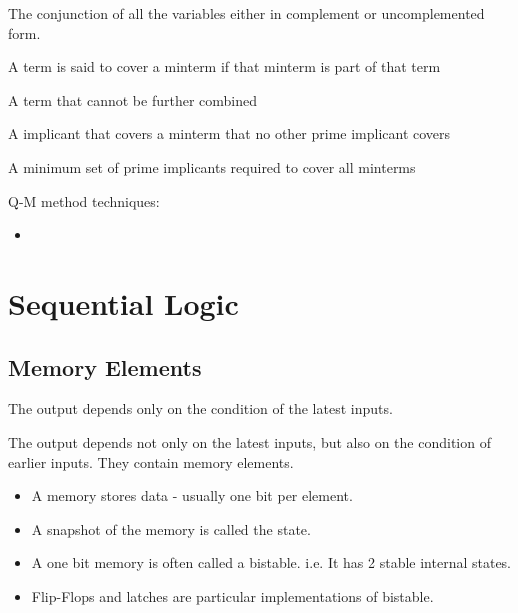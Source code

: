 \documentclass[a4paper]{article}
\begin{document}
\begin{defi}[Minterms]
The conjunction of all the variables either in complement or uncomplemented form.
\end{defi}

\begin{defi}[Cover]
A term is said to cover a minterm if that minterm is part of that term
\end{defi}
\begin{defi}
A term that cannot be further combined
\end{defi}
\begin{defi}
A implicant that covers a minterm that no other prime implicant covers
\end{defi}
\begin{defi}
A minimum set of prime implicants required to cover all minterms
\end{defi}

Q-M method techniques:
\begin{itemize}
\item 
\end{itemize}
\section{Sequential Logic}
\subsection{Memory Elements}
\begin{defi}
The output depends only on the condition of the latest inputs.
\end{defi}

\begin{defi}
The output depends not only on the latest inputs, but also on the condition of earlier inputs. They contain memory elements.
\begin{itemize}
\item A memory stores data - usually one bit per element.
\item A snapshot of the memory is called the state.
\item A one bit memory is often called a bistable. i.e. It has 2 stable internal states.
\item Flip-Flops and latches are particular implementations of bistable.
\end{itemize}
\end{defi}
\end{document}
